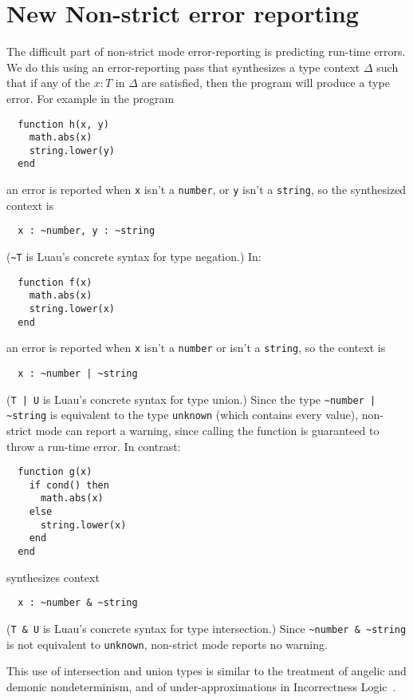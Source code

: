 \documentclass[sigplan]{acmart}
\begin{document}
\section{New Non-strict error reporting}

The difficult part of non-strict mode error-reporting is predicting
run-time errors. We do this using an error-reporting
pass that synthesizes a type context $\Delta$ such that if any of the $x : T$ in
$\Delta$ are satisfied, then the program will
produce a type error. For example in the program
\begin{verbatim}
  function h(x, y)
    math.abs(x)
    string.lower(y)
  end
\end{verbatim}
an error is reported when \verb|x| isn’t a \verb|number|, or \verb|y| isn’t a \verb|string|, so the synthesized context is
\begin{verbatim}
  x : ~number, y : ~string
\end{verbatim}
(\verb|~T| is Luau's concrete syntax for type negation.)
In:
\begin{verbatim}
  function f(x)
    math.abs(x)
    string.lower(x)
  end
\end{verbatim}
an error is reported when \verb|x| isn’t a \verb|number| or isn’t a \verb|string|, so the context is
\begin{verbatim}
  x : ~number | ~string
\end{verbatim}
(\verb"T | U" is Luau's concrete syntax for type union.)
Since the type \verb"~number | ~string" is equivalent to the type \verb|unknown| (which contains every value),
non-strict mode can report a warning, since calling the function is guaranteed to throw a run-time error.
In contrast:
\begin{verbatim}
  function g(x)
    if cond() then
      math.abs(x)
    else
      string.lower(x)
    end
  end
\end{verbatim}
synthesizes context
\begin{verbatim}
  x : ~number & ~string
\end{verbatim}
(\verb|T & U| is Luau's concrete syntax for type intersection.)
Since \verb|~number & ~string| is not equivalent to \verb|unknown|, non-strict mode reports no warning.

This use of intersection and union types is similar to the treatment of angelic
and demonic nondeterminism, and of under-approximations in Incorrectness Logic~\cite{Ohe19:IncorrectnessLogic}.
\end{document}

